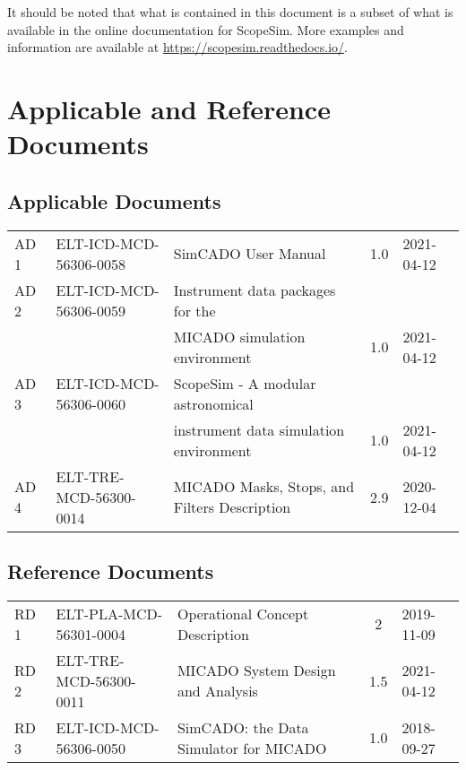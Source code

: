 It should be noted that what is contained in this document is a subset of what is available in the online documentation for ScopeSim.
More examples and information are available at \url{https://scopesim.readthedocs.io/}.


\section{Applicable and Reference Documents}
\label{sec:documents}

\subsection{Applicable Documents}

\begin{center}
  \tabletail{\hline}

  \begin{supertabular}{|l|l|l|c|l|}
    AD\,1 & ELT-ICD-MCD-56306-0058 & SimCADO User Manual & 1.0 & 2021-04-12 \\
    AD\,2 & ELT-ICD-MCD-56306-0059 & Instrument data packages for the & & \\
    & & MICADO simulation environment & 1.0 & 2021-04-12 \\
    AD\,3 & ELT-ICD-MCD-56306-0060 & ScopeSim - A modular astronomical & & \\
    & & instrument data simulation environment & 1.0 & 2021-04-12 \\
    AD\,4 & ELT-TRE-MCD-56300-0014 & MICADO Masks, Stops, and Filters Description & 2.9 & 2020-12-04 \\
  \end{supertabular}
\end{center}

\subsection{Reference Documents}

\begin{center}
  \tabletail{\hline}

  \begin{supertabular}{|l|l|l|c|l|}
    \hline
    RD\,1 & ELT-PLA-MCD-56301-0004 & Operational Concept Description &
    2 & 2019-11-09 \\
    RD\,2 & ELT-TRE-MCD-56300-0011 & MICADO System Design and Analysis & 1.5 &
    2021-04-12 \\
    RD\,3 & ELT-ICD-MCD-56306-0050 & SimCADO: the Data Simulator for MICADO & 1.0 & 2018-09-27 \\

  \end{supertabular}
\end{center}